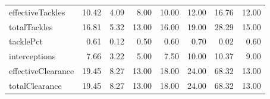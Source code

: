 \begin{table}[H]
\begin{tabular}{lrrrrrrr}
effectiveTackles & 10.42 & 4.09 & 8.00 & 10.00 & 12.00 & 16.76 & 12.00 \\
totalTackles & 16.81 & 5.32 & 13.00 & 16.00 & 19.00 & 28.29 & 15.00 \\
tacklePct & 0.61 & 0.12 & 0.50 & 0.60 & 0.70 & 0.02 & 0.60 \\
interceptions & 7.66 & 3.22 & 5.00 & 7.50 & 10.00 & 10.37 & 9.00 \\
effectiveClearance & 19.45 & 8.27 & 13.00 & 18.00 & 24.00 & 68.32 & 13.00 \\
totalClearance & 19.45 & 8.27 & 13.00 & 18.00 & 24.00 & 68.32 & 13.00 \\
\hline
\end{tabular}
\end{table}
